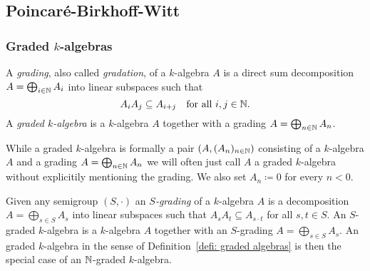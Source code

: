 




\subsection{Poincar\'{e}-Birkhoff-Witt}



\subsubsection{Graded $k$-algebras}


\begin{defi}\label{defi: graded algebras}
 A \emph{grading}, also called \emph{gradation}, of a $k$-algebra $A$ is a direct sum decomposition $A = \bigoplus_{i \in \mathbb{N}} A_i$ into linear subspaces such that
 \[
  A_i A_j \subseteq A_{i+j} \quad \text{for all $i,j \in \mathbb{N}$}.
 \]
 A \emph{graded $k$-algebra} is a $k$-algebra $A$ together with a grading $A = \bigoplus_{n \in \mathbb{N}} A_n$.
\end{defi}


\begin{rem}
 While a graded $k$-algebra is formally a pair $(A, (A_n)_{n \in \mathbb{N}})$ consisting of a $k$-algebra $A$ and a grading $A = \bigoplus_{n \in \mathbb{N}} A_n$ we will often just call $A$ a graded $k$-algebra without explicitily mentioning the grading. We also set $A_n \coloneqq 0$ for every $n < 0$.
\end{rem}


\begin{rem}
 Given any semigroup $(S,\cdot)$ an \emph{$S$-grading} of a $k$-algebra $A$ is a decomposition $A = \bigoplus_{s \in S} A_s$ into linear subspaces such that $A_s A_t \subseteq A_{s \cdot t}$ for all $s,t \in S$. An $S$-graded $k$-algebra is a $k$-algebra $A$ together with an $S$-grading $A = \bigoplus_{s \in S} A_s$. An graded $k$-algebra in the sense of Definition~\ref{defi: graded algebras} is then the special case of an $\mathbb{N}$-graded $k$-algebra.
\end{rem}


